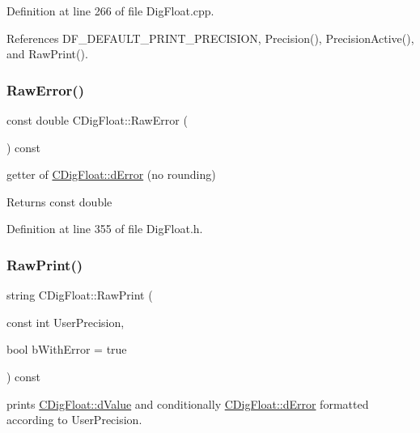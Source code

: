 Definition at line 266 of file Dig\+Float.\+cpp.



References D\+F\+\_\+\+D\+E\+F\+A\+U\+L\+T\+\_\+\+P\+R\+I\+N\+T\+\_\+\+P\+R\+E\+C\+I\+S\+I\+ON, Precision(), Precision\+Active(), and Raw\+Print().

\mbox{\label{classCDigFloat_a9805530caa01cc722cfbe8912689daa7}} 
\subsubsection{\texorpdfstring{Raw\+Error()}{RawError()}}
{\footnotesize\ttfamily const double C\+Dig\+Float\+::\+Raw\+Error (\begin{DoxyParamCaption}{ }\end{DoxyParamCaption}) const\hspace{0.3cm}{\ttfamily [inline]}}



getter of \hyperlink{classCDigFloat_a25eb3782d1e727ff007a48f8308e3d4d}{C\+Dig\+Float\+::d\+Error} (no rounding) 

\begin{DoxyReturn}{Returns}
const double 
\end{DoxyReturn}


Definition at line 355 of file Dig\+Float.\+h.

\mbox{\label{classCDigFloat_a7051716ffe1294bab6ed6e194a73618e}} 
\subsubsection{\texorpdfstring{Raw\+Print()}{RawPrint()}}
{\footnotesize\ttfamily string C\+Dig\+Float\+::\+Raw\+Print (\begin{DoxyParamCaption}\item[{const int}]{User\+Precision,  }\item[{bool}]{b\+With\+Error = {\ttfamily true} }\end{DoxyParamCaption}) const}



prints \hyperlink{classCDigFloat_a4bbe69e30dd4e20527362493aa9aaf96}{C\+Dig\+Float\+::d\+Value} and conditionally \hyperlink{classCDigFloat_a25eb3782d1e727ff007a48f8308e3d4d}{C\+Dig\+Float\+::d\+Error} formatted according to User\+Precision. 


